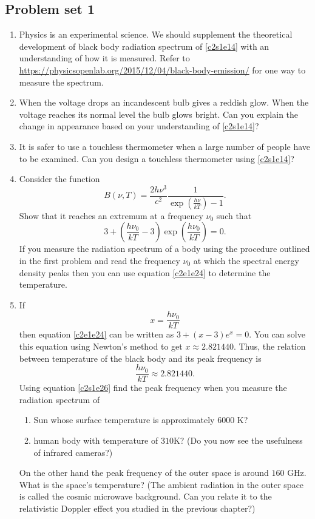 \subsection{Problem set 1}
\begin{enumerate}
\item Physics is an experimental science. We should supplement the theoretical
development of black body radiation spectrum of \eqref{c2s1e14} with an 
understanding of how it is measured. Refer to 
\url{https://physicsopenlab.org/2015/12/04/black-body-emission/} for one way to
measure the spectrum.
\item When the voltage drops an incandescent bulb gives a reddish glow. When the
voltage reaches its normal level the bulb glows bright. Can you explain the 
change in appearance based on your understanding of \eqref{c2s1e14}?
\item It is safer to use a touchless thermometer when a large number of people
have to be examined. Can you design a touchless thermometer using 
\eqref{c2s1e14}?
\item Consider the function
\begin{equation}\label{c2e1e23}
B(\nu, T) = \frac{2h\nu^3}{c^2}\frac{1}{\exp\left(\frac{h\nu}{kT}\right) - 1}.
\end{equation}
Show that it reaches an extremum at a frequency $\nu_0$ such that
\begin{equation}\label{c2e1e24}
3 + \left(\frac{h\nu_0}{kT} - 3\right)\exp\left(\frac{h\nu_0}{kT}\right) = 0.
\end{equation}
If you measure the radiation spectrum of a body using the procedure outlined
in the first problem and read the frequency $\nu_0$ at which the spectral energy 
density peaks then you can use equation \eqref{c2e1e24} to determine the 
temperature.
\item If 
\begin{equation}\label{c2e1e25}
x = \frac{h\nu_0}{kT}
\end{equation}
then equation \eqref{c2e1e24} can be written as $3 + (x - 3)e^x = 0$. You can
solve this equation using Newton's method to get $x \approx 2.821440$. Thus,
the relation between temperature of the black body and its peak frequency is
\begin{equation}\label{c2s1e26}
\frac{h\nu_0}{kT} \approx 2.821440.
\end{equation}
Using equation \eqref{c2s1e26} find the peak frequency when you measure the
radiation spectrum of
\begin{enumerate}
\item Sun whose surface temperature is approximately $6000$ K?
\item human body with temperature of $310$K? (Do you now see the usefulness
of infrared cameras?)
\end{enumerate}
On the other hand the peak frequency of the outer space is around $160$ GHz.
What is the space's temperature? (The ambient radiation in the outer space 
is called the cosmic microwave background. Can you relate it to the relativistic
Doppler effect you studied in the previous chapter?)
\end{enumerate}